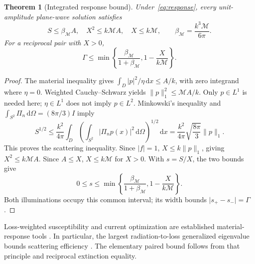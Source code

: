\documentclass[11pt]{article}
\newtheorem{theorem}{Theorem}[section]
\newcommand{\dd}{\,\mathrm{d}}
\newcommand{\norm}[1]{\lVert #1\rVert}
\newcommand{\abs}[1]{\lvert #1\rvert}
\begin{document}
\begin{theorem}[Integrated response bound]\label{thm:response}
Under~\eqref{eq:response}, every unit-amplitude plane-wave solution satisfies
\begin{equation}\label{eq:response-bounds}
 S\leq\beta_{\mathcal M}A,\quad X^2\leq k\mathcal M A,\quad
 X\leq k\mathcal M,\qquad \beta_{\mathcal M}=\frac{k^3\mathcal M}{6\pi}.
\end{equation}
For a reciprocal pair with $X>0$,
\begin{equation}\label{eq:response-gamma}
 \Gamma\leq\min\left\{\frac{\beta_{\mathcal M}}{1+\beta_{\mathcal M}},
                          1-\frac{X}{k\mathcal M}\right\}.
\end{equation}
\end{theorem}
\begin{proof}
The material inequality gives $\int_D\abs p^2/\eta\dd x\leq A/k$, with zero integrand where $\eta=0$. Weighted Cauchy--Schwarz yields $\norm p_1^2\leq\mathcal M A/k$. Only $p\in L^1$ is needed here; $\eta\in L^1$ does not imply $p\in L^2$. Minkowski's inequality and $\int_{S^2}\Pi_n\dd\Omega=(8\pi/3)I$ imply
\[
 S^{1/2}\leq\frac{k^2}{4\pi}\int_D
 \left(\int_{S^2}\abs{\Pi_np(x)}^2\dd\Omega\right)^{1/2}\dd x
 =\frac{k^2}{4\pi}\sqrt{\frac{8\pi}{3}}\norm p_1.
\]
This proves the scattering inequality. Since $\abs f=1$, $X\leq k\norm p_1$, giving $X^2\leq k\mathcal M A$. Since $A\leq X$, $X\leq k\mathcal M$ for $X>0$. With $s=S/X$, the two bounds give
\[
 0\leq s\leq\min\left\{\frac{\beta_{\mathcal M}}{1+\beta_{\mathcal M}},
                         1-\frac{X}{k\mathcal M}\right\}.
\]
Both illuminations occupy this common interval; its width bounds $\abs{s_+-s_-}=\Gamma$.
\end{proof}

Loss-weighted susceptibility and current optimization are established material-response tools \citep{Miller2016,Schab2020,Gustafsson2020,Kuang2020}. In particular, the largest radiation-to-loss generalized eigenvalue bounds scattering efficiency \citep[Sec.~3.1]{Schab2020}. The elementary paired bound follows from that principle and reciprocal extinction equality.
\end{document}
